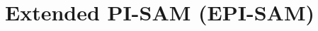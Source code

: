 \documentclass[letterpaper]{article} %
\newcommand{\tuple}[1]{\ensuremath{\left \langle #1 \right \rangle }}
\newcommand{\pre}{\textit{pre}}
\newcommand{\pisam}{\textit{PI-SAM}\xspace}
\newtheorem{observation}[theorem]{Observation}
\begin{document}




\section{Extended PI-SAM (EPI-SAM)}


\end{document}
